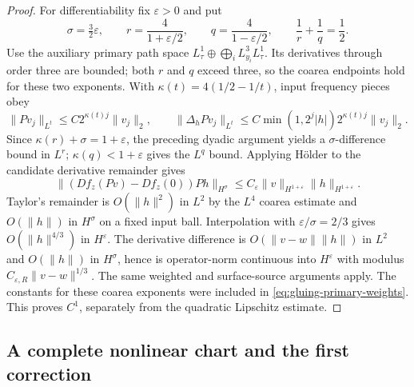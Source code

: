 \documentclass[11pt]{amsart}
\theoremstyle{definition}
\theoremstyle{remark}
\theoremstyle{plain}
\begin{document}
\begin{proof}
For differentiability fix $\varepsilon>0$ and put
\[
 \sigma=\tfrac32\varepsilon,\qquad
 r=\frac4{1+\varepsilon/2},\qquad
 q=\frac4{1-\varepsilon/2},\qquad \frac1r+\frac1q=\frac12.
\]
Use the auxiliary primary path space
$L^1_\tau\oplus\bigoplus_i L^3_{y_i}L^1_\tau$.
Its derivatives through order three are bounded; both $r$ and $q$
exceed three, so the coarea endpoints hold for these two exponents.
With $\kappa(t)=4(1/2-1/t)$, input frequency pieces obey
\[
 \|Pv_j\|_{L^t}\leq C2^{\kappa(t)j}\|v_j\|_2,\qquad
 \|\Delta_hPv_j\|_{L^t}\leq C\min(1,2^j|h|)2^{\kappa(t)j}\|v_j\|_2.
\]
Since $\kappa(r)+\sigma=1+\varepsilon$, the preceding dyadic
argument yields a $\sigma$-difference bound in $L^r$;
$\kappa(q)<1+\varepsilon$ gives the $L^q$ bound. Applying
H\"older to the candidate derivative remainder gives
\[
 \|(Df_z(Pv)-Df_z(0))Ph\|_{H^\sigma}
                    \leq C_\varepsilon\|v\|_{H^{1+\varepsilon}}
                                             \|h\|_{H^{1+\varepsilon}}.
\]
Taylor's remainder is $O(\|h\|^2)$ in $L^2$ by the $L^4$
coarea estimate and $O(\|h\|)$ in $H^\sigma$ on a fixed
input ball. Interpolation with $\varepsilon/\sigma=2/3$ gives
$O(\|h\|^{4/3})$ in $H^\varepsilon$. The derivative difference
is $O(\|v-w\|\|h\|)$ in $L^2$ and $O(\|h\|)$ in
$H^\sigma$, hence is operator-norm continuous into $H^\varepsilon$
with modulus $C_{\varepsilon,R}\|v-w\|^{1/3}$.
The same weighted and surface-source arguments apply. The constants
for these coarea exponents were included in
\eqref{eq:gluing-primary-weights}. This proves $C^1$, separately
from the quadratic Lipschitz estimate.
\end{proof}

\subsection{A complete nonlinear chart and the first correction}
\end{document}
